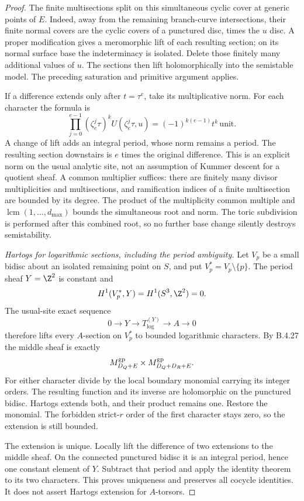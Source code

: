 \begin{proof}
The finite multisections split on this
simultaneous cyclic cover at generic points
of $E$.
Indeed, away from the remaining branch-curve
intersections, their finite normal covers
are the cyclic covers of a punctured disc,
times the $u$ disc. A proper modification
gives a meromorphic lift of each resulting
section; on its normal surface base the
indeterminacy is isolated. Delete those
finitely many additional values of $u$.
The sections then lift holomorphically into
the semistable model. The preceding
saturation and primitive argument applies.

If a difference extends only after
$t=\tau^e$, take its multiplicative norm.
For each character the formula is
\[
 \prod_{j=0}^{e-1}(\zeta_e^j\tau)^k
                      U(\zeta_e^j\tau,u)
   =(-1)^{k(e-1)}t^k\,\text{unit}.
 \tag{B.4.30.10}
\]
A change of lift adds an integral period,
whose norm remains a period. The resulting
section downstairs is $e$ times the original
difference. This is an explicit norm on the
usual analytic site, not an assumption of
Kummer descent for a quotient sheaf. A
common multiplier suffices: there are
finitely many divisor multiplicities and
multisections, and ramification indices of
a finite multisection are bounded by its
degree. The product of the multiplicity
common multiple and
$\operatorname{lcm}(1,\ldots,d_{\max})$
bounds the simultaneous root and norm.
The toric subdivision is performed after
this combined root, so no further base
change silently destroys semistability.

\emph{Hartogs for logarithmic sections, including the period ambiguity.}
Let $V_p$ be a small bidisc about an isolated
remaining point on $S$, and put
$V_p^*=V_p\setminus\{p\}$. The period sheaf
$Y=\Z^2$ is constant and
\[
 H^1(V_p^*,Y)=H^1(S^3,\Z^2)=0.
\]
The usual-site exact sequence
\[
 0\longrightarrow Y\longrightarrow
 T_{\log}^{(Y)}\longrightarrow A\longrightarrow0
 \tag{B.4.30.11}
\]
therefore lifts every $A$-section on $V_p^*$
to bounded logarithmic characters. By
B.4.27 the middle sheaf is exactly
\[
 M_{D_Q+E}^{\rm gp}\times
 M_{D_Q+D_R+E}^{\rm gp}.
\]
For either character divide by the local
boundary monomial carrying its integer
orders. The resulting function and its
inverse are holomorphic on the punctured
bidisc. Hartogs extends both, and their
product remains one. Restore the monomial.
The forbidden strict-$r$ order of the first
character stays zero, so the extension is
still bounded.

The extension is unique. Locally lift the
difference of two extensions to the middle
sheaf. On the connected punctured bidisc
it is an integral period, hence one constant
element of $Y$. Subtract that period and
apply the identity theorem to its two
characters. This proves uniqueness and
preserves all cocycle identities. It does
not assert Hartogs extension for $A$-torsors.


\end{proof}
